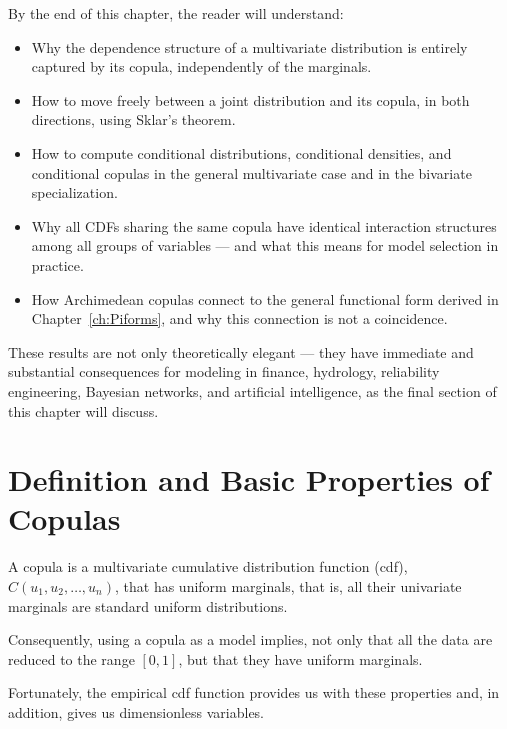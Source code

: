 By the end of this chapter, the reader will understand:
\begin{itemize}
    \item Why the dependence structure of a multivariate distribution is entirely
    captured by its copula, independently of the marginals.

    \item How to move freely between a joint distribution and its copula, in both
    directions, using Sklar's theorem.

    \item How to compute conditional distributions, conditional densities, and
    conditional copulas in the general multivariate case and in the bivariate
    specialization.

    \item Why all CDFs sharing the same copula have identical interaction structures
    among all groups of variables — and what this means for model selection in
    practice.

    \item How Archimedean copulas connect to the general functional form derived in
    Chapter~\ref{ch:Piforms}, and why this connection is not a coincidence.
\end{itemize}

\noindent These results are not only theoretically elegant — they have immediate and
substantial consequences for modeling in finance, hydrology, reliability engineering,
Bayesian networks, and artificial intelligence, as the final section of this chapter
will discuss.

\section{Definition and Basic Properties of Copulas}\label{sec:definition}
\begin{definition}
\label{def:copula}
A copula is a multivariate cumulative distribution function (cdf), $C(u_1,u_2,\ldots,u_n)$, that has uniform marginals, that is, all their univariate marginals are standard uniform distributions.
\end{definition}

Consequently, using a copula as a model implies, not only that all the data are reduced to the range $[0,1]$, but that they have uniform marginals.

Fortunately, the empirical cdf function provides us with these properties and, in addition, gives us dimensionless variables.

